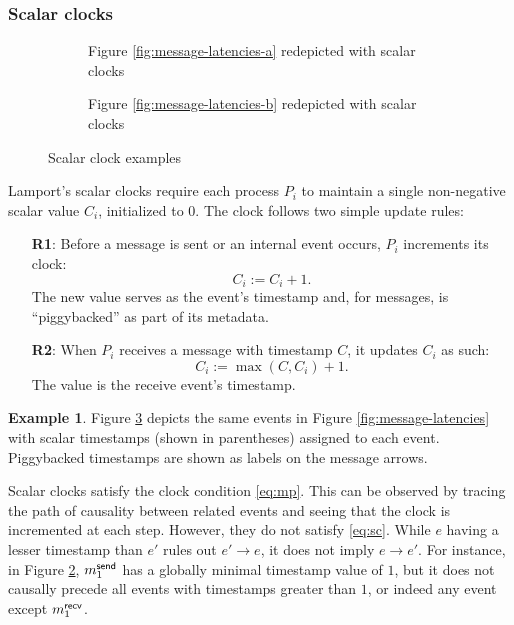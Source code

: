 \documentclass[]             %
{NASA}                       %
\theoremstyle{definition}
\newtheorem{example}[theorem]{Example}
\begin{document}
\subsubsection{Scalar clocks}
\label{sssec:scalar-clocks}
\begin{figure}
  \setlength\belowcaptionskip{5ex}

  \begin{subfigure}{1\textwidth}
    \centering 
    \caption{Figure \ref{fig:message-latencies-a} redepicted with scalar clocks}
    \label{fig:message-latencies-scalar-a}
  \end{subfigure}

  \begin{subfigure}{1\textwidth}
    \centering 
    \caption{Figure \ref{fig:message-latencies-b} redepicted with scalar clocks}
    \label{fig:message-latencies-scalar-b}
  \end{subfigure}

  \caption{Scalar clock examples}
  \label{fig:message-latencies-scalar}
\end{figure}

Lamport's scalar clocks \cite{1978:lamportclocks} require each
process $P_i$ to maintain a single non-negative scalar value $C_i$,
initialized to $0$. The clock follows two simple update rules:
\begin{enumerate}
\item[\textbf{R1}:] Before a message is sent or an internal event occurs, $P_i$
  increments its clock:
  \[C_i := C_i + 1.\]
  The new value serves as the event's timestamp and, for messages, is ``piggybacked''
  as part of its metadata.
\item[\textbf{R2}:] When $P_i$ receives a message with timestamp $C$, it
  updates $C_i$ as such:
  \[C_i := \max(C, C_i) + 1.\]
  The value is the receive event's timestamp.
\end{enumerate}

\begin{example}
  Figure \ref{fig:message-latencies-scalar} depicts the same events in
  Figure \ref{fig:message-latencies} with scalar timestamps (shown in
  parentheses) assigned to each event. Piggybacked timestamps are
  shown as labels on the message arrows.
\end{example}

Scalar clocks satisfy the clock condition \eqref{eq:mp}. This can be
observed by tracing the path of causality between related events and
seeing that the clock is incremented at each step. However, they do
not satisfy \eqref{eq:sc}.  While $e$ having a lesser timestamp than
$e'$ rules out $e' \to e$, it does not imply $e \to e'$. For instance,
in Figure \ref{fig:message-latencies-scalar-b}, $m_{1}^{\mathsf{send}}$ has a
globally minimal timestamp value of $1$, but it does not causally
precede all events with timestamps greater than $1$, or indeed any
event except $m_{1}^{\mathsf{recv}}$.
\end{document}
